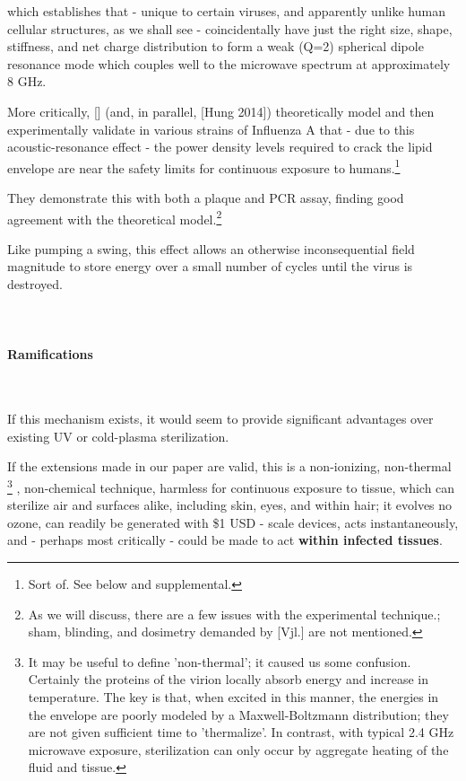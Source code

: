 \documentclass[fleqn,10pt]{article}
\begin{document}
\clearpage	
\begin{multicols}{1}




which establishes that - unique to certain viruses, and apparently unlike human cellular structures, as we shall see - coincidentally have just the right size, shape, stiffness, and net charge distribution to form a weak (Q=2) spherical dipole resonance mode which couples well to the microwave spectrum at approximately 8 GHz.

More critically, [] (and, in parallel, [Hung 2014]) theoretically model and then experimentally validate in various strains of Influenza A that - due to this acoustic-resonance effect - the power density levels required to crack the lipid envelope are near the safety limits for continuous exposure to humans.\footnote{Sort of. See below and supplemental.}

They demonstrate this with both a plaque and PCR assay, finding good agreement with the theoretical model.\footnote{As we will discuss, there are a few issues with the experimental technique.; sham, blinding, and dosimetry demanded by [Vjl.] are not mentioned.}

Like pumping a swing, this effect allows an otherwise inconsequential field magnitude to store energy over a small number of cycles until the virus is destroyed. \\
\\\\

\paragraph{Ramifications}\

If this mechanism exists, it would seem to provide significant advantages over existing UV or cold-plasma sterilization. 

If the extensions made in our paper are valid, this is a non-ionizing, non-thermal
%
\footnote{It may be useful to define 'non-thermal'; it caused us some confusion. Certainly the proteins of the virion locally absorb energy and increase in temperature. The key is that, when excited in this manner, the energies in the envelope are poorly modeled by a Maxwell-Boltzmann distribution; they are not given sufficient time to 'thermalize'. In contrast, with typical 2.4 GHz microwave exposure, sterilization can only occur by aggregate heating of the fluid and tissue.} 
%
, non-chemical technique, harmless for continuous exposure to tissue, which can sterilize air and surfaces alike, including skin, eyes, and within hair; it evolves no ozone, can readily be generated with \$1 USD - scale devices, acts instantaneously, and - perhaps most critically - could be made to act {\bf within infected tissues}.


\end{multicols}
\end{document}
